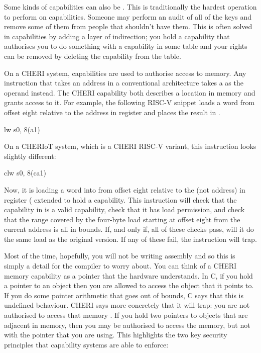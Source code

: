 Some kinds of capabilities can also be .
This is traditionally the hardest operation to perform on capabilities.
Someone may perform an audit of all of the keys and remove some of them from people that shouldn't have them.
This is often solved in capabilities by adding a layer of indirection; you hold a capability that authorises you to do something with a capability in some table and your rights can be removed by deleting the capability from the table.

On a CHERI system, capabilities are used to authorise access to memory.
Any instruction that takes an address in a conventional architecture takes a  as the operand instead.
The CHERI capability both describes a location in memory and grants access to it.
For example, the following RISC-V snippet loads a word from offset eight relative to the address in register  and places the result in .

\begin{asmsnippet}
	lw	s0, 8(a1)
\end{asmsnippet}

On a CHERIoT system, which is a CHERI RISC-V variant, this instruction looks slightly different:

\begin{asmsnippet}
	clw	s0, 8(ca1)
\end{asmsnippet}

Now, it is loading a word into  from offset eight relative to the  (not address) in register  ( extended to hold a capability.
This instruction will check that the capability in  is a valid capability, check that it has load permission, and check that the range covered by the four-byte load starting at offset eight from the current address is all in bounds.
If, and only if, all of these checks pass, will it do the same load as the original version.
If any of these fail, the instruction will trap.


Most of the time, hopefully, you will not be writing assembly and so this is simply a detail for the compiler to worry about.
You can think of a CHERI memory capability as a pointer that the hardware understands.
In C, if you hold a pointer to an object then you are allowed to access the object that it points to.
If you do some pointer arithmetic that goes out of bounds, C says that this is undefined behaviour.
CHERI says more concretely that it will trap: you are not authorised to access that memory .
If you hold two pointers to objects that are adjacent in memory, then you may be authorised to access the memory, but not with the pointer that you are using.
This highlights the two key security principles that capability systems are able to enforce:

